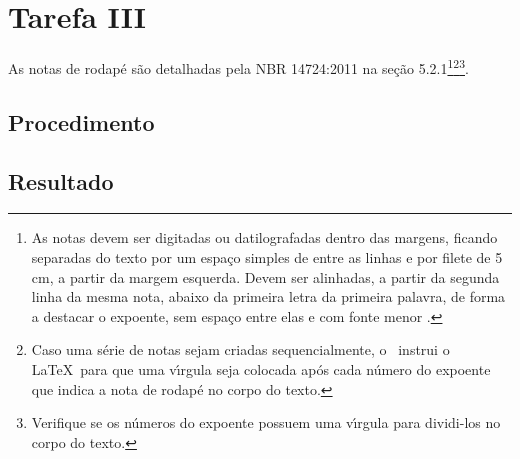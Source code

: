 \section{Tarefa III}

As notas de rodap\'{e} s\~{a}o detalhadas pela NBR 14724:2011 na se\c{c}\~{a}o 5.2.1\footnote{As
notas devem ser digitadas ou datilografadas dentro das margens, ficando
separadas do texto por um espa\c{c}o simples de entre as linhas e por filete de 5
cm, a partir da margem esquerda. Devem ser alinhadas, a partir da segunda linha
da mesma nota, abaixo da primeira letra da primeira palavra, de forma a destacar
o expoente, sem espa\c{c}o entre elas e com fonte menor
.}\footnote{Caso uma s\'{e}rie de notas sejam
criadas sequencialmente, o \abnTeX\ instrui o \LaTeX\ para que uma v\'{\i}rgula seja
colocada ap\'{o}s cada n\'{u}mero do expoente que indica a nota de rodap\'{e} no corpo do
texto.}\footnote{Verifique se os n\'{u}meros do expoente possuem uma v\'{\i}rgula para
dividi-los no corpo do texto.}.

\subsection{Procedimento}
\subsection{Resultado}



